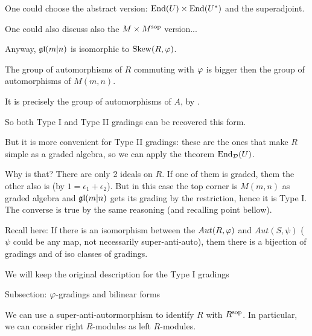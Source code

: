\documentclass{amsbook}
\begin{document}
\begin{todolist}
        \item One could choose the abstract version: $\operatorname{End} (U) \times \operatorname{End}(U^*)$ and the superadjoint.
        
        \item One could also discuss also the $M \times M^{\mathrm{sop}}$ version...
        
        \item Anyway, $\mathfrak{gl}(m|n)$ is isomorphic to $\operatorname{Skew} (R, \varphi)$.
        
        \item The group of automorphisms of $R$ commuting with $\varphi$ is bigger then the group of automorphisms of $M(m,n)$.
        
        \item It is precisely the group of automorphisms of $A$, by \cite{serganova}.
        
        \item So both Type I and Type II gradings can be recovered this form.
        
        \item But it is more convenient for Type II gradings: these are the ones that make $R$ simple as a graded algebra, so we can apply the theorem $\operatorname{End}_{\mathcal{D}} (U)$.
        
        \item Why is that? There are only 2 ideals on $R$. If one of them is graded, them the other also is (by $1 =  \epsilon_1 + \epsilon_2$). But in this case the top corner is $M(m,n)$ as graded algebra and $\mathfrak{gl}(m|n)$ gets its grading by the restriction, hence it is Type I. The converse is true by the same reasoning (and recalling point bellow).
        
        \item Recall here: If there is an isomorphism between the $Aut(R, \varphi)$ and $Aut(S, \psi)$ ($\psi$ could be any map, not necessarily super-anti-auto), them there is a bijection of gradings and of iso classes of gradings.
        
        \item We will keep the original description for the Type I gradings
        
        \item Subsection: $\varphi$-gradings and bilinear forms
        
        \item We can use a super-anti-autormorphism to identify $R$ with $R^{\mathrm{sop}}$. In particular, we can consider right $R$-modules as left $R$-modules.
        

\end{todolist}
\end{document}
